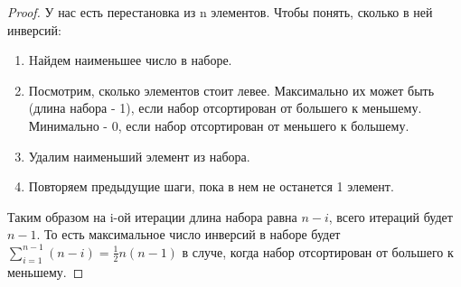 
\begin{proof}

 У нас есть перестановка из n элементов. Чтобы понять, сколько в ней инверсий: \begin{enumerate}
    \item Hайдем наименьшее число в наборе.
    \item Посмотрим, сколько элементов стоит левее. Максимально их может быть (длина набора - 1), если набор отсортирован от большего к меньшему. Минимально - 0, если набор отсортирован от меньшего к большему.
    \item Удалим наименьший элемент из набора. 
    \item Повторяем предыдущие шаги, пока в нем не останется 1 элемент.
\end{enumerate}
    
Таким образом на i-ой итерации длина набора равна $n-i$, всего итераций будет $n-1$. То есть максимальное число инверсий в наборе будет $\sum_{i=1}^{n-1} (n-i) = \frac{1}{2}n(n-1)$ в случе, когда набор отсортирован от большего к меньшему.

\end{proof}
